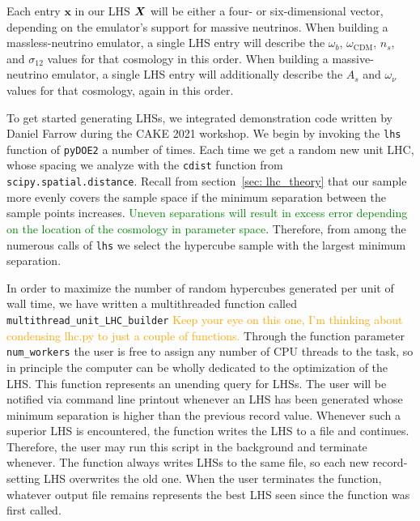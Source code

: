 
Each entry $\bm{x}$ in our LHS $\bm{X}$ will be either a four- or six-dimensional vector, 
depending on the emulator's support for massive neutrinos. When building a
massless-neutrino emulator, a single LHS entry will describe the $\omega_b$,
$\omega_\text{CDM}$, $n_s$, and $\sigma_{12}$ values for that cosmology in 
this order. When building a massive-neutrino emulator, a single LHS entry will 
additionally describe the $A_s$ and $\omega_\nu$ values for that cosmology, 
again in this order.

To get started generating LHSs, we integrated demonstration code written by 
Daniel Farrow  
during the CAKE 2021 workshop. We begin by invoking the \verb|lhs| function of
\verb|pyDOE2| a number of times. Each time we get a random new unit LHC, whose
spacing we analyze with the \verb|cdist| function from
\verb|scipy.spatial.distance|.  Recall from section~\ref{sec: lhc_theory} that
our sample more evenly covers the sample space if the minimum separation 
between the sample points increases. \textcolor{green}{Uneven separations will
result in excess error depending on the location of the cosmology in parameter
space}. Therefore, from among the numerous calls of \verb|lhs| we select the
hypercube sample with the largest minimum separation.

In order to maximize the number of random hypercubes generated per unit of
wall time, we have written a multithreaded function called
\verb|multithread_unit_LHC_builder| \textcolor{orange}{Keep your eye on this
one, I'm thinking about condensing lhc.py to just a couple of functions.}
Through the function parameter \verb|num_workers| the user is free to assign
any number of CPU threads to the task, so in principle the computer can be
wholly dedicated to the optimization of the LHS. This function represents an
unending query for LHSs. The user will be notified via command
line printout whenever an LHS has been generated whose minimum separation is
higher than the previous record value. Whenever such a superior LHS is
encountered, the function writes the LHS to a file and continues. Therefore,
the user may run this script in the background and terminate whenever. The
function always writes LHSs to the same file, so each new record-setting LHS
overwrites the old one. When the user terminates the function, whatever output
file remains represents the best LHS seen since the function was first called.

